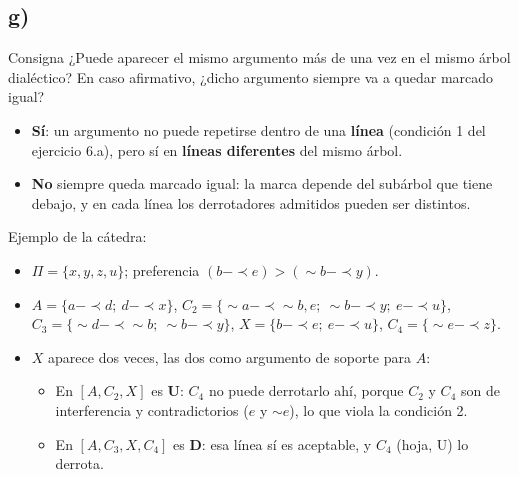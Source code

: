 \documentclass[11pt,a4paper]{article}
\newcommand{\reb}{\mathrel{-\!\!\!\prec}}         %
\begin{document}
\subsection{g)}

\begin{enunciado}{Consigna}
¿Puede aparecer el mismo argumento más de una vez en el mismo árbol dialéctico? En caso afirmativo, ¿dicho argumento siempre va a quedar marcado igual?
\end{enunciado}

\begin{itemize}
  \item \textbf{Sí}: un argumento no puede repetirse dentro de una \textbf{línea} (condición 1 del ejercicio 6.a), pero sí en \textbf{líneas diferentes} del mismo árbol.
  \item \textbf{No} siempre queda marcado igual: la marca depende del subárbol que tiene debajo, y en cada línea los derrotadores admitidos pueden ser distintos.
\end{itemize}

Ejemplo de la cátedra:
\begin{itemize}
  \item $\Pi = \{x, y, z, u\}$; preferencia $(b \reb e) > ({\sim}b \reb y)$.
  \item $A = \{a \reb d;\ d \reb x\}$, $C_2 = \{{\sim}a \reb {\sim}b, e;\ {\sim}b \reb y;\ e \reb u\}$, $C_3 = \{{\sim}d \reb {\sim}b;\ {\sim}b \reb y\}$, $X = \{b \reb e;\ e \reb u\}$, $C_4 = \{{\sim}e \reb z\}$.
  \item $X$ aparece dos veces, las dos como argumento de soporte para $A$:
  \begin{itemize}
    \item En $[A, C_2, X]$ es \textbf{U}: $C_4$ no puede derrotarlo ahí, porque $C_2$ y $C_4$ son de interferencia y contradictorios ($e$ y ${\sim}e$), lo que viola la condición 2.
    \item En $[A, C_3, X, C_4]$ es \textbf{D}: esa línea sí es aceptable, y $C_4$ (hoja, U) lo derrota.
  \end{itemize}
\end{itemize}
\end{document}
